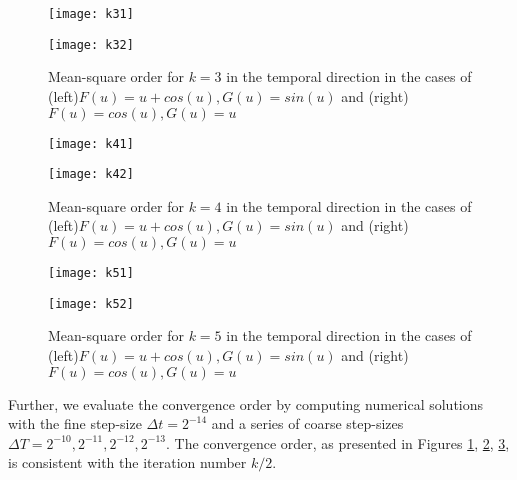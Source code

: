 \documentclass[preprint,12pt]{elsarticle}
\begin{document}
\begin{figure}[htpb]
	\centering
	\begin{minipage}[b]{0.33\textwidth}
		\centering
		\texttt{[image: k31]}
	\end{minipage}
	\hfill %
	\begin{minipage}[b]{0.52\textwidth}
		\centering
		\texttt{[image: k32]}
	\end{minipage}
	\caption{Mean-square order for $k=3$ in the temporal direction in the cases of (left)$F(u)=u+cos(u),G(u)=sin(u)$ and (right)$F(u)=cos(u),G(u)=u$}
	\label{fig3}
\end{figure}
\begin{figure}[htpb]
	\centering
	\begin{minipage}[b]{0.33\textwidth}
		\centering
		\texttt{[image: k41]}
	\end{minipage}
	\hfill %
	\begin{minipage}[b]{0.52\textwidth}
		\centering
		\texttt{[image: k42]}
	\end{minipage}
	\caption{Mean-square order for $k=4$ in the temporal direction in the cases of (left)$F(u)=u+cos(u),G(u)=sin(u)$ and (right)$F(u)=cos(u),G(u)=u$}
	\label{fig4}
\end{figure}
\begin{figure}[htpb]
	\centering
	\begin{minipage}[b]{0.33\textwidth}
		\centering
		\texttt{[image: k51]}
	\end{minipage}
	\hfill %
	\begin{minipage}[b]{0.52\textwidth}
		\centering
		\texttt{[image: k52]}
	\end{minipage}
	\caption{Mean-square order for $k=5$ in the temporal direction in the cases of (left)$F(u)=u+cos(u),G(u)=sin(u)$ and (right)$F(u)=cos(u),G(u)=u$}
	\label{fig5}
\end{figure}

Further, we evaluate the convergence order by computing numerical solutions with the fine step-size  $\Delta t= 2^{-14}$ and  a series of coarse step-sizes $\Delta T=2^{-10},2^{-11},2^{-12},2^{-13}$. The convergence order, as presented in Figures \ref{fig3}, \ref{fig4}, \ref{fig5}, is consistent with the iteration number $k/2$.
\end{document}
